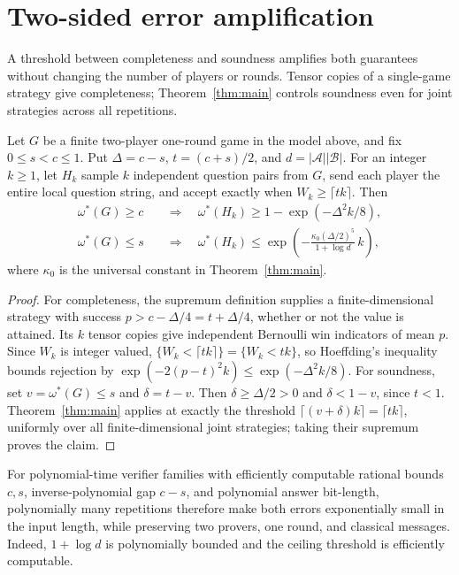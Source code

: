 \section{Two-sided error amplification}
\label{sec:amplification}

A threshold between completeness and soundness amplifies both guarantees
without changing the number of players or rounds. Tensor copies of a
single-game strategy give completeness; Theorem~\ref{thm:main} controls
soundness even for joint strategies across all repetitions.

\begin{corollary}
\label{cor:error-amplification}
Let $G$ be a finite two-player one-round game in the model above, and
fix $0\le s<c\le1$. Put $\Delta=c-s$, $t=(c+s)/2$, and
$d=|\mathcal A||\mathcal B|$. For an integer $k\ge1$, let $H_k$ sample $k$
independent question pairs from $G$, send each player the entire local
question string, and accept exactly when $W_k\ge\lceil tk\rceil$.
Then
\begin{align*}
 \omega^*(G)\ge c
 &\quad\Longrightarrow\quad
 \omega^*(H_k)\ge1-\exp(-\Delta^2k/8),\\
 \omega^*(G)\le s
 &\quad\Longrightarrow\quad
 \omega^*(H_k)\le
 \exp\!\left(-\frac{\kappa_0(\Delta/2)^5}{1+\log d}\,k\right),
\end{align*}
where $\kappa_0$ is the universal constant in Theorem~\ref{thm:main}.
\end{corollary}
\begin{proof}
For completeness, the supremum definition supplies a finite-dimensional
strategy with success $p>c-\Delta/4=t+\Delta/4$, whether or not the
value is attained. Its $k$ tensor copies give independent Bernoulli win
indicators of mean $p$. Since $W_k$ is integer valued,
$\{W_k<\lceil tk\rceil\}=\{W_k<tk\}$, so Hoeffding's inequality
\cite[Theorem~2]{hoeffding1963} bounds rejection by
$\exp(-2(p-t)^2k)\le\exp(-\Delta^2k/8)$.
For soundness, set $v=\omega^*(G)\le s$ and $\delta=t-v$.
Then $\delta\ge\Delta/2>0$ and $\delta<1-v$, since $t<1$.
Theorem~\ref{thm:main} applies at exactly the threshold
$\lceil(v+\delta)k\rceil=\lceil tk\rceil$, uniformly over all
finite-dimensional joint strategies; taking their supremum proves the
claim.
\end{proof}

For polynomial-time verifier families with efficiently computable rational
bounds $c,s$, inverse-polynomial gap $c-s$, and polynomial answer
bit-length, polynomially many repetitions therefore make both errors
exponentially small in the input length, while preserving two provers,
one round, and classical messages. Indeed, $1+\log d$ is polynomially
bounded and the ceiling threshold is efficiently computable.
